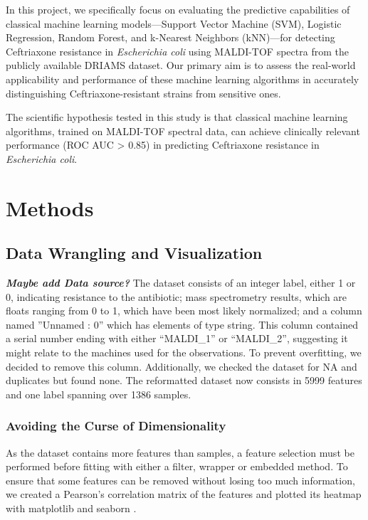 \documentclass{article}
\begin{document}
In this project, we specifically focus on evaluating the predictive capabilities of classical machine learning models—Support Vector Machine (SVM), Logistic Regression, Random Forest, and k-Nearest Neighbors (kNN)—for detecting Ceftriaxone resistance in \textit{Escherichia coli} using MALDI-TOF spectra from the publicly available DRIAMS dataset. Our primary aim is to assess the real-world applicability and performance of these machine learning algorithms in accurately distinguishing Ceftriaxone-resistant strains from sensitive ones.

The scientific hypothesis tested in this study is that classical machine learning algorithms, trained on MALDI-TOF spectral data, can achieve clinically relevant performance (ROC AUC > 0.85) in predicting Ceftriaxone resistance in \textit{Escherichia coli}.

\section{Methods}

\subsection{Data Wrangling and Visualization}
\textbf{\textit{Maybe add Data source? 
}}The dataset consists of an integer label, either 1 or 0, indicating resistance to the antibiotic; mass
spectrometry results, which are floats ranging from 0 to 1, which have been most likely normalized; and a
column named ”Unnamed : 0” which has elements of type string. This column contained a serial number
ending with either “MALDI\_1” or “MALDI\_2”, suggesting it might relate to the machines used for the
observations. To prevent overfitting, we decided to remove this column. Additionally, we checked the
dataset for NA and duplicates but found none. The reformatted dataset now consists in 5999 features
and one label spanning over 1386 samples. 

\subsubsection{Avoiding the Curse of Dimensionality}

As the dataset contains more features than samples, a feature
selection must be performed before fitting with either a filter, wrapper or embedded method. To ensure
that some features can be removed without losing too much information, we created a Pearson’s correlation
matrix of the features and plotted its heatmap with matplotlib \citep{matplotlib} and seaborn \citep{seaborn}.\\
\end{document}
